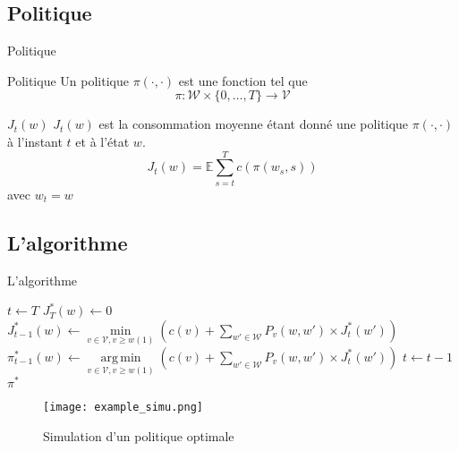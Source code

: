 \documentclass{beamer}
\DeclareMathOperator*{\argmin}{arg\,min}
\newcommand{\V}{\mathcal{V}}
\newcommand{\W}{\mathcal{W}}
\begin{document}
\subsection{Politique}
\begin{frame}{Politique}
  \begin{block}{Politique}
    Un politique $\pi(\cdot,\cdot)$ est une fonction tel que
    \[
      \pi:\W\times \{0,\dots,T\}\rightarrow\V
    \]
  \end{block}

  \begin{block}{$J_t(w)$}
    $J_t(w)$ est la consommation moyenne étant donné une politique
    $\pi(\cdot,\cdot)$ à l'instant $t$ et à l'état $w$.\\
    \[
      J_t(w)=\mathbb{E}\sum_{s=t}^Tc(\pi(w_s,s))
    \]
    avec $w_t=w$
  \end{block}
  
\end{frame}

\subsection{L'algorithme}

\begin{frame}{L'algorithme}
  \begin{algorithm}[H]
    \caption{Algorithme de programmation dynamique pour trouver la
      politique optimale}
    \label{alg:dpa}
    \begin{algorithmic}
      \STATE $t\leftarrow T$
      \FORALL{$w\in\W$}
      \STATE $J_T^*(w)\leftarrow 0$
      \ENDFOR
      \FORALL{$w\in\W$}
      \STATE $J_{t-1}^*(w)\leftarrow
      \min\limits_{v\in\V,v\geq
        w(1)}\left(c(v)+\sum\limits_{w'\in\W}P_v(w,w')\times
        J_t^*(w')\right)$
      \STATE $\pi_{t-1}^*(w)\leftarrow
      \argmin\limits_{v\in\V,v\geq
        w(1)}\left(c(v)+\sum\limits_{w'\in\W}P_v(w,w')\times
        J_t^*(w')\right)$
      \ENDFOR
      \STATE $t\leftarrow t-1$
      \ENDWHILE
      \RETURN $\pi^*$
    \end{algorithmic}
  \end{algorithm}
  
\end{frame}

\begin{frame}
  \begin{figure}
    \centering
    \texttt{[image: example\_simu.png]}
    \caption{Simulation d'un politique optimale}
    \label{fig:exemple}
  \end{figure}
\end{frame}
\end{document}
